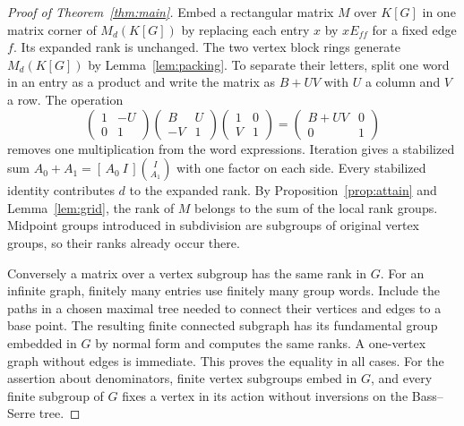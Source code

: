 \documentclass[11pt,a4paper,reqno]{amsart}
\numberwithin{equation}{section}
\theoremstyle{remark}
\begin{document}
\begin{proof}[Proof of Theorem~\ref{thm:main}]
Embed a rectangular matrix \(M\) over \(K[G]\) in one matrix corner of \(M_d(K[G])\) by replacing each entry \(x\) by \(xE_{ff}\) for a fixed edge \(f\). Its expanded rank is unchanged. The two vertex block rings generate \(M_d(K[G])\) by Lemma~\ref{lem:packing}. To separate their letters, split one word in an entry as a product and write the matrix as \(B+UV\) with \(U\) a column and \(V\) a row. The operation
\[
 \begin{pmatrix}1&-U\\0&1\end{pmatrix}
 \begin{pmatrix}B&U\\-V&1\end{pmatrix}
 \begin{pmatrix}1&0\\V&1\end{pmatrix}
       =\begin{pmatrix}B+UV&0\\0&1\end{pmatrix}
\]
removes one multiplication from the word expressions. Iteration gives a stabilized sum \(A_0+A_1=[\,A_0\ I\,]\binom{I}{A_1}\) with one factor on each side. Every stabilized identity contributes \(d\) to the expanded rank. By Proposition~\ref{prop:attain} and Lemma~\ref{lem:grid}, the rank of \(M\) belongs to the sum of the local rank groups. Midpoint groups introduced in subdivision are subgroups of original vertex groups, so their ranks already occur there.

Conversely a matrix over a vertex subgroup has the same rank in \(G\). For an infinite graph, finitely many entries use finitely many group words. Include the paths in a chosen maximal tree needed to connect their vertices and edges to a base point. The resulting finite connected subgraph has its fundamental group embedded in \(G\) by normal form and computes the same ranks. A one-vertex graph without edges is immediate. This proves the equality in all cases. For the assertion about denominators, finite vertex subgroups embed in \(G\), and every finite subgroup of \(G\) fixes a vertex in its action without inversions on the Bass--Serre tree.
\end{proof}
\end{document}

